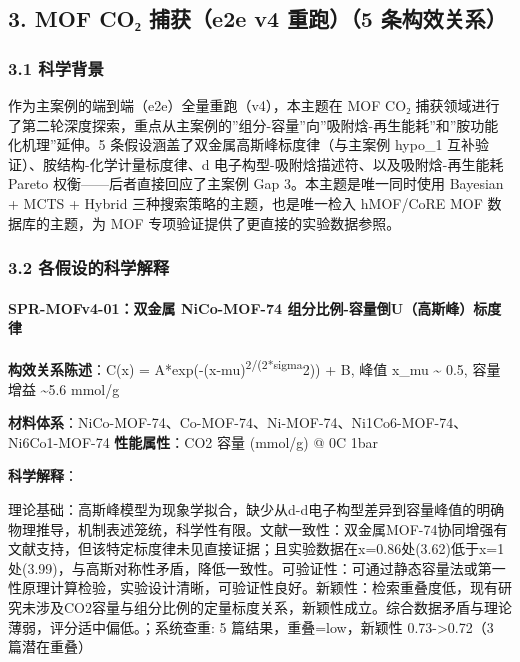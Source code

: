 \documentclass[12pt,a4paper]{ctexart}
\begin{document}
\subsection{3. MOF CO₂ 捕获（e2e v4 重跑）（5 条构效关系）}\label{mof-coux2082-ux6355ux83b7e2e-v4-ux91cdux8dd15-ux6761ux6784ux6548ux5173ux7cfb}

\subsubsection{3.1 科学背景}\label{ux79d1ux5b66ux80ccux666f-1}

作为主案例的端到端（e2e）全量重跑（v4），本主题在 MOF CO₂ 捕获领域进行了第二轮深度探索，重点从主案例的''组分-容量''向''吸附焓-再生能耗''和''胺功能化机理''延伸。5 条假设涵盖了双金属高斯峰标度律（与主案例 hypo\_1 互补验证）、胺结构-化学计量标度律、d 电子构型-吸附焓描述符、以及吸附焓-再生能耗 Pareto 权衡------后者直接回应了主案例 Gap 3。本主题是唯一同时使用 Bayesian + MCTS + Hybrid 三种搜索策略的主题，也是唯一检入 hMOF/CoRE MOF 数据库的主题，为 MOF 专项验证提供了更直接的实验数据参照。

\subsubsection{3.2 各假设的科学解释}\label{ux5404ux5047ux8bbeux7684ux79d1ux5b66ux89e3ux91ca-1}

\paragraph{SPR-MOFv4-01：双金属 NiCo-MOF-74 组分比例-容量倒U（高斯峰）标度律}\label{spr-mofv4-01ux53ccux91d1ux5c5e-nico-mof-74-ux7ec4ux5206ux6bd4ux4f8b-ux5bb9ux91cfux5012uux9ad8ux65afux5cf0ux6807ux5ea6ux5f8b}

\textbf{构效关系陈述}：C(x) = A*exp(-(x-mu)\textsuperscript{2/(2*sigma}2)) + B, 峰值 x\_mu \textasciitilde{} 0.5, 容量增益 \textasciitilde5.6 mmol/g

\textbf{材料体系}：NiCo-MOF-74、Co-MOF-74、Ni-MOF-74、Ni1Co6-MOF-74、Ni6Co1-MOF-74 \textbar{} \textbf{性能属性}：CO2 容量 (mmol/g) @ 0C 1bar

\textbf{科学解释}：

理论基础：高斯峰模型为现象学拟合，缺少从d-d电子构型差异到容量峰值的明确物理推导，机制表述笼统，科学性有限。文献一致性：双金属MOF-74协同增强有文献支持，但该特定标度律未见直接证据；且实验数据在x=0.86处(3.62)低于x=1处(3.99)，与高斯对称性矛盾，降低一致性。可验证性：可通过静态容量法或第一性原理计算检验，实验设计清晰，可验证性良好。新颖性：检索重叠度低，现有研究未涉及CO2容量与组分比例的定量标度关系，新颖性成立。综合数据矛盾与理论薄弱，评分适中偏低。；系统查重: 5 篇结果，重叠=low，新颖性 0.73-\textgreater0.72（3 篇潜在重叠）
\end{document}
